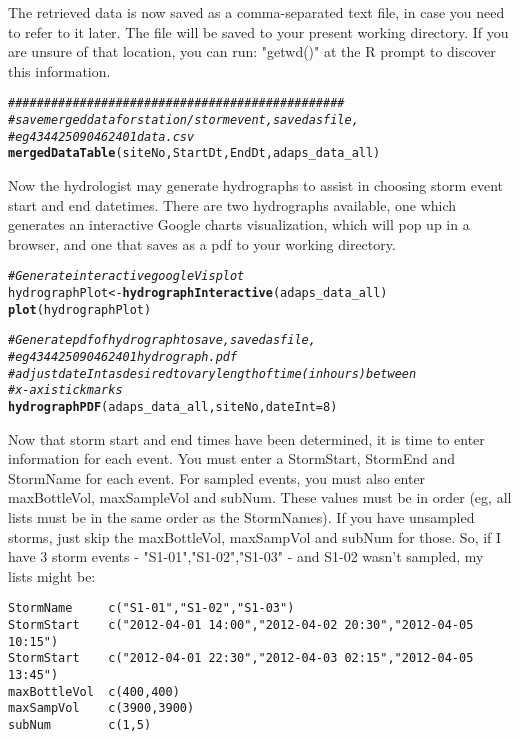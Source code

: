 \documentclass[a4paper,11pt]{article}\usepackage[]{graphicx}\usepackage[]{color}
\makeatletter
\newcommand{\hlnum}[1]{\textcolor[rgb]{0.686,0.059,0.569}{#1}}%
\newcommand{\hlcom}[1]{\textcolor[rgb]{0.678,0.584,0.686}{\textit{#1}}}%
\newcommand{\hlstd}[1]{\textcolor[rgb]{0.345,0.345,0.345}{#1}}%
\newcommand{\hlkwb}[1]{\textcolor[rgb]{0.69,0.353,0.396}{#1}}%
\newcommand{\hlkwc}[1]{\textcolor[rgb]{0.333,0.667,0.333}{#1}}%
\newcommand{\hlkwd}[1]{\textcolor[rgb]{0.737,0.353,0.396}{\textbf{#1}}}%
\newenvironment{kframe}{%
 \def\at@end@of@kframe{}%
 \ifinner\ifhmode%
  \def\at@end@of@kframe{\end{minipage}}%
  \begin{minipage}{\columnwidth}%
 \fi\fi%
 \def\FrameCommand##1{\hskip\@totalleftmargin \hskip-\fboxsep
 \colorbox{shadecolor}{##1}\hskip-\fboxsep
     \hskip-\linewidth \hskip-\@totalleftmargin \hskip\columnwidth}%
 \MakeFramed {\advance\hsize-\width
   \@totalleftmargin\z@ \linewidth\hsize
   \@setminipage}}%
 {\par\unskip\endMakeFramed%
 \at@end@of@kframe}
\newenvironment{knitrout}{}{} %
\makeatother
\begin{document}
The retrieved data is now saved as a comma-separated text file, in case you need to refer to it later. The file will be saved to your present working directory. If you are unsure of that location, you can run: "getwd()" at the R prompt to discover this information.

\begin{knitrout}
\color{fgcolor}\begin{kframe}
\begin{alltt}
\hlcom{###############################################}
\hlcom{# save merged data for station/storm event, saved as file, }
\hlcom{# eg 434425090462401data.csv }
\hlkwd{mergedDataTable}\hlstd{(siteNo,StartDt,EndDt,adaps_data_all)}
\end{alltt}
\end{kframe}
\end{knitrout}


Now the hydrologist may generate hydrographs to assist in choosing storm event start and end datetimes. There are two hydrographs available, one which generates an interactive Google charts visualization, which will pop up in a browser, and one that saves as a pdf to your working directory.

\begin{knitrout}
\color{fgcolor}\begin{kframe}
\begin{alltt}
\hlcom{# Generate interactive googleVis plot}
\hlstd{hydrographPlot} \hlkwb{<-} \hlkwd{hydrographInteractive}\hlstd{(adaps_data_all)}
\hlkwd{plot}\hlstd{(hydrographPlot)}

\hlcom{# Generate pdf of hydrograph to save, saved as file, }
\hlcom{# eg 434425090462401hydrograph.pdf }
\hlcom{# adjust dateInt as desired to vary length of time (in hours) between }
\hlcom{# x-axis tick marks}
\hlkwd{hydrographPDF}\hlstd{(adaps_data_all,siteNo,}\hlkwc{dateInt}\hlstd{=}\hlnum{8}\hlstd{)}
\end{alltt}
\end{kframe}
\end{knitrout}


Now that storm start and end times have been determined, it is time to enter information for each event. You must enter a StormStart, StormEnd and StormName for each event. For sampled events, you must also enter maxBottleVol, maxSampleVol and subNum. These values must be in order (eg, all lists must be in the same order as the StormNames). If you have unsampled storms, just skip the maxBottleVol, maxSampVol and subNum for those. So, if I have 3 storm events - "S1-01","S1-02","S1-03" - and S1-02 wasn't sampled, my lists might be:
\begin{verbatim}
StormName     c("S1-01","S1-02","S1-03")
StormStart    c("2012-04-01 14:00","2012-04-02 20:30","2012-04-05 10:15")
StormStart    c("2012-04-01 22:30","2012-04-03 02:15","2012-04-05 13:45")
maxBottleVol  c(400,400)
maxSampVol    c(3900,3900)
subNum        c(1,5)
\end{verbatim}
\end{document}
